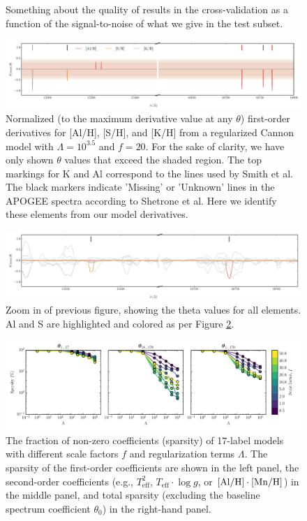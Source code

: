 \documentclass[12pt,preprint]{aastex}
\newcommand{\logg}{\log g}
\newcommand{\Teff}{T_{\mathrm{eff}}}
\begin{document}
\begin{figure}[p]
\caption{Something about the quality of results in the
  cross-validation as a function of the signal-to-noise of what we
  give in the test subset.\label{fig:snr}}
\end{figure}


\begin{figure}[p]
\includegraphics[width=\textwidth]{sparse-first-order-coefficients.pdf}
\caption{Normalized (to the maximum derivative value at any $\theta$) first-order derivatives for [Al/H], [S/H], and [K/H] from a regularized Cannon model with $\Lambda = 10^{3.5}$ and $f = 20$. For the sake of clarity, we have only shown $\theta$ values that exceed the shaded region. The top markings for K and Al correspond to the lines used by Smith et al. The black markers indicate 'Missing' or 'Unknown' lines in the APOGEE spectra according to Shetrone et al. Here we identify these elements from our model derivatives.  \label{fig:inferring-lines}}
\end{figure}

\begin{figure}[p]
\includegraphics[width=\textwidth]{sparse-first-order-coefficients-zoom.pdf}
\caption{Zoom in of previous figure, showing the theta values for all elements. Al and S are highlighted and colored as per Figure \ref{fig:inferring-lines}.\label{fig:inferring-lines2}}
\end{figure}


\begin{figure}[p]
\includegraphics[width=\textwidth]{sparsity.pdf}
\caption{The fraction of non-zero coefficients (sparsity) of 17-label models with different scale factors $f$ and regularization terms $\Lambda$.  The sparsity of the first-order coefficients are shown in the left panel, the second-order coefficients (e.g., $\Teff^2$, $\Teff\cdot\logg$, or $[\rm{Al}/\rm{H}]\cdot[\rm{Mn}/\rm{H}]$) in the middle panel, and total sparsity (excluding the baseline spectrum coefficient $\theta_0$) in the right-hand panel.\label{fig:sparsity}}
\end{figure}
\end{document}
